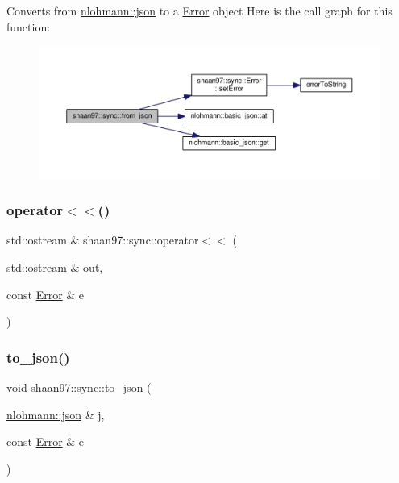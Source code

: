 Converts from {\ttfamily \hyperlink{namespacenlohmann_a2bfd99e845a2e5cd90aeaf1b1431f474}{nlohmann\+::json}} to a {\ttfamily \hyperlink{classshaan97_1_1sync_1_1_error}{Error}} object Here is the call graph for this function\+:\nopagebreak
\begin{figure}[H]
\begin{center}
\leavevmode
\includegraphics[width=350pt]{namespaceshaan97_1_1sync_a9e374973ba3aed17d32efd550318c94c_cgraph}
\end{center}
\end{figure}
\mbox{\label{namespaceshaan97_1_1sync_a734625a59747d9c85857e245a8975bb9}} 
\subsubsection{\texorpdfstring{operator$<$$<$()}{operator<<()}}
{\footnotesize\ttfamily std\+::ostream \& shaan97\+::sync\+::operator$<$$<$ (\begin{DoxyParamCaption}\item[{std\+::ostream \&}]{out,  }\item[{const \hyperlink{classshaan97_1_1sync_1_1_error}{Error} \&}]{e }\end{DoxyParamCaption})}

\mbox{\label{namespaceshaan97_1_1sync_a6ccb9e98c182a3bac3ee37ad64f76bbc}} 
\subsubsection{\texorpdfstring{to\+\_\+json()}{to\_json()}}
{\footnotesize\ttfamily void shaan97\+::sync\+::to\+\_\+json (\begin{DoxyParamCaption}\item[{\hyperlink{namespacenlohmann_a2bfd99e845a2e5cd90aeaf1b1431f474}{nlohmann\+::json} \&}]{j,  }\item[{const \hyperlink{classshaan97_1_1sync_1_1_error}{Error} \&}]{e }\end{DoxyParamCaption})}

